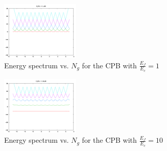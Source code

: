 \documentclass[twocolumn]{revtex4}
\newcommand{\figwidth}{0.33\textwidth}
\begin{document}
\begin{figure}
  \includegraphics[width=\figwidth]{CPB-1.png}
  \caption{Energy spectrum vs. $N_g$ for the CPB with
    $\frac{E_J}{E_c}=1$}
  \label{cpb-1}
\end{figure}
\begin{figure}
  \includegraphics[width=\figwidth]{CPB-10.png}
  \caption{Energy spectrum vs. $N_g$ for the CPB with
    $\frac{E_J}{E_c}=10$}
  \label{cpb-10}
\end{figure}
\end{document}
